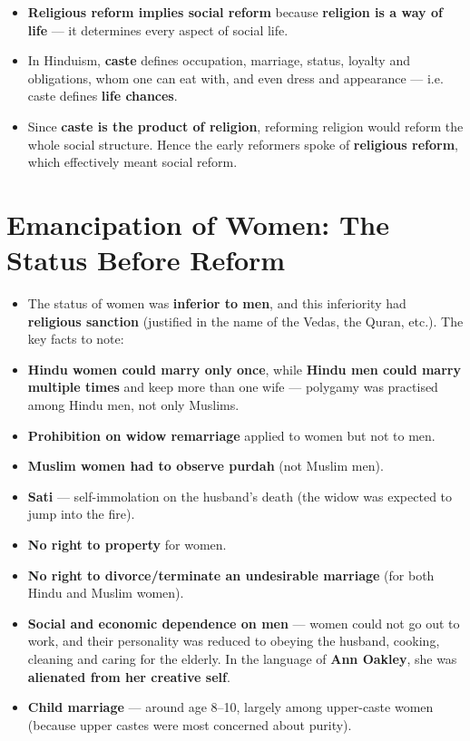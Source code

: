 \begin{KeyConcept}
\begin{itemize}
\item \textbf{Religious reform implies social reform} because \textbf{religion is a way of life} --- it determines every aspect of social life.
\item In Hinduism, \textbf{caste} defines occupation, marriage, status, loyalty and obligations, whom one can eat with, and even dress and appearance --- i.e. caste defines \textbf{life chances}.
\item Since \textbf{caste is the product of religion}, reforming religion would reform the whole social structure. Hence the early reformers spoke of \textbf{religious reform}, which effectively meant social reform.
\end{itemize}
\end{KeyConcept}

\section{Emancipation of Women: The Status Before Reform}

\begin{KeyConcept}
\begin{itemize}
\item The status of women was \textbf{inferior to men}, and this inferiority had \textbf{religious sanction} (justified in the name of the Vedas, the Quran, etc.). The key facts to note:
\item \textbf{Hindu women could marry only once}, while \textbf{Hindu men could marry multiple times} and keep more than one wife --- polygamy was practised among Hindu men, not only Muslims.
\item \textbf{Prohibition on widow remarriage} applied to women but not to men.
\item \textbf{Muslim women had to observe purdah} (not Muslim men).
\item \textbf{Sati} --- self-immolation on the husband's death (the widow was expected to jump into the fire).
\item \textbf{No right to property} for women.
\item \textbf{No right to divorce/terminate an undesirable marriage} (for both Hindu and Muslim women).
\item \textbf{Social and economic dependence on men} --- women could not go out to work, and their personality was reduced to obeying the husband, cooking, cleaning and caring for the elderly. In the language of \textbf{Ann Oakley}, she was \textbf{alienated from her creative self}.
\item \textbf{Child marriage} --- around age 8--10, largely among upper-caste women (because upper castes were most concerned about purity).
\end{itemize}
\end{KeyConcept}

